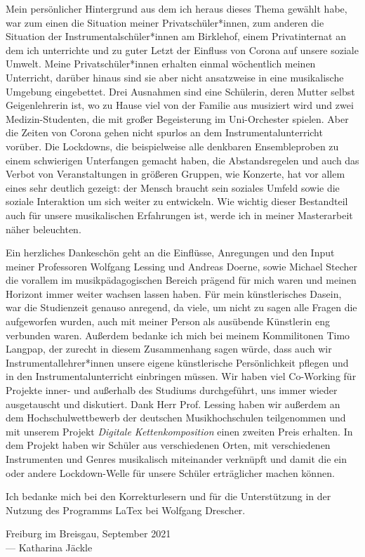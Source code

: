 
Mein persönlicher Hintergrund aus dem ich heraus dieses Thema gewählt habe, war
zum einen die Situation meiner Privatschüler*innen, zum anderen die Situation
der Instrumentalschüler*innen am Birklehof, einem Privatinternat an dem ich
unterrichte und zu guter Letzt der Einfluss von Corona auf unsere soziale
Umwelt. Meine Privatschüler*innen erhalten einmal wöchentlich meinen Unterricht,
darüber hinaus sind sie aber nicht ansatzweise in eine musikalische Umgebung
eingebettet. Drei Ausnahmen sind eine Schülerin, deren Mutter selbst
Geigenlehrerin ist, wo zu Hause viel von der Familie aus musiziert wird und zwei
Medizin-Studenten, die mit großer Begeisterung im Uni-Orchester spielen. Aber
die Zeiten von Corona gehen nicht spurlos an dem Instrumentalunterricht vorüber.
Die Lockdowns, die beispielweise alle denkbaren Ensembleproben zu einem
schwierigen Unterfangen gemacht haben, die Abstandsregelen und auch das Verbot
von Veranstaltungen in größeren Gruppen, wie Konzerte, hat vor allem eines sehr
deutlich gezeigt: der Mensch braucht sein soziales Umfeld sowie die soziale
Interaktion um sich weiter zu entwickeln. Wie wichtig dieser Bestandteil auch
für unsere musikalischen Erfahrungen ist, werde ich in meiner Masterarbeit näher
beleuchten.

Ein herzliches Dankeschön geht an die Einflüsse, Anregungen und den Input meiner
Professoren Wolfgang Lessing und Andreas Doerne, sowie Michael Stecher die
vorallem im musikpädagogischen Bereich prägend für mich waren und meinen
Horizont immer weiter wachsen lassen haben. Für mein künstlerisches Dasein, war
die Studienzeit genauso anregend, da viele, um nicht zu sagen alle Fragen die
aufgeworfen wurden, auch mit meiner Person als ausübende Künstlerin eng
verbunden waren. Außerdem bedanke ich mich bei meinem Kommilitonen Timo Langpap,
der zurecht in diesem Zusammenhang sagen würde, dass auch wir
Instrumentallehrer*innen unsere eigene künstlerische Persönlichkeit pflegen und
in den Instrumentalunterricht einbringen müssen. Wir haben viel Co-Working für
Projekte inner- und außerhalb des Studiums durchgeführt, uns immer wieder
ausgetauscht und diskutiert. Dank Herr Prof. Lessing haben wir außerdem an dem
Hochschulwettbewerb der deutschen Musikhochschulen teilgenommen und mit unserem
Projekt \emph{Digitale Kettenkomposition} einen zweiten Preis erhalten. In dem
Projekt haben wir Schüler aus verschiedenen Orten, mit verschiedenen
Instrumenten und Genres musikalisch miteinander verknüpft und damit die ein oder
andere Lockdown-Welle für unsere Schüler erträglicher machen können. 

Ich bedanke mich bei den Korrekturlesern und für die Unterstützung in der
Nutzung des Programms LaTex bei Wolfgang Drescher.




\vspace{0.5cm}

\begin{flushright}
	{
		\small
		Freiburg im Breisgau, September 2021\\
		--- Katharina Jäckle }
\end{flushright}
